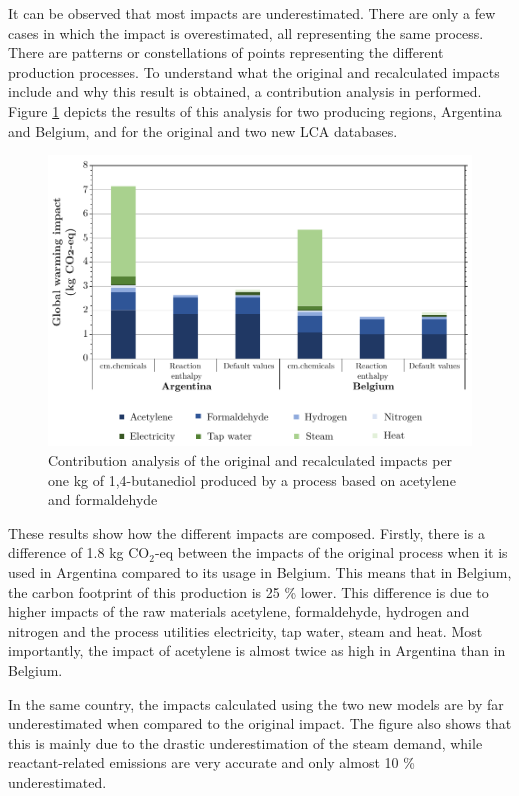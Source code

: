 It can be observed that most impacts are underestimated. There are only a few cases in which the impact is overestimated, all representing the same process. There are patterns or constellations of points representing the different production processes. To understand what the original and recalculated impacts include and why this result is obtained, a contribution analysis in performed. Figure \ref{fig:contribution butanediol} depicts the results of this analysis for two producing regions, Argentina and Belgium, and for the original and two new LCA databases.


\begin{figure}[htp!]
        \centering
        \includegraphics[width=\textwidth]{images/contribution_butanediol.pdf}
        \caption{Contribution analysis of the original and recalculated impacts per one kg of 1,4-butanediol produced by a process based on acetylene and formaldehyde}
        \label{fig:contribution butanediol}
\end{figure}

These results show how the different impacts are composed. Firstly, there is a difference of 1.8 kg CO$_2$-eq between the impacts of the original process when it is used in Argentina compared to its usage in Belgium. This means that in Belgium, the carbon footprint of this production is 25 \% lower. This difference is due to higher impacts of the raw materials acetylene, formaldehyde, hydrogen and nitrogen and the process utilities electricity, tap water, steam and heat. Most importantly, the impact of acetylene is almost twice as high in Argentina than in Belgium. 

In the same country, the impacts calculated using the two new models are by far underestimated when compared to the original impact. The figure also shows that this is mainly due to the drastic underestimation of the steam demand, while reactant-related emissions are very accurate and only almost 10 \% underestimated. 

